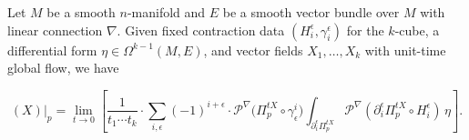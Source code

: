 \begin{theorem}
Let $M$ be a smooth $n$-manifold and $E$ be a smooth vector bundle over $M$ with linear connection $\nabla$. Given fixed contraction data $(H_i^\epsilon, \gamma_i^\epsilon)$ for the $k$-cube, a differential form $\eta \in \Omega^{k-1}(M, E)$, and vector fields $X_1, \ldots, X_k$ with unit-time global flow, we have

\begin{equation}
  [\mathrm{d}\!^\nabla\!\eta](X)|_p = \lim_{t \to 0} \left[ \frac{1}{t_1 \cdots t_k} \cdot \sum_{i, \epsilon} (-1)^{i + \epsilon} \cdot  \mathcal{P}^{\nabla}\big(\Pi^{tX}_p \circ \gamma^i_{\epsilon}\big) \int_{\partial_i^\epsilon \Pi^{tX}_p} \mathcal{P}^\nabla(\partial_i^\epsilon\Pi^{tX}_p \circ H_i^\epsilon)\, \eta \right]\!\!.
\end{equation}
\end{theorem}


